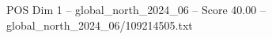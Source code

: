 \begin{textsample}{POS Dim 1 – global\_north\_2024\_06 – Score 40.00 – global\_north\_2024\_06/109214505.txt}
\end{textsample}
